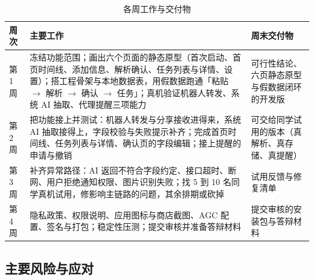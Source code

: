 \documentclass[12pt,a4paper,fontset=windows]{ctexart}
\begin{document}
\begin{table}[tbp]
\centering
\footnotesize
\begin{tabularx}{\textwidth}{@{}p{1.5cm}>{\raggedright\arraybackslash}X>{\raggedright\arraybackslash}p{4.2cm}@{}}
\toprule
周次 & 主要工作 & 周末交付物 \\
\midrule
第 1 周 & 冻结功能范围；画出六个页面的静态原型（首次启动、首页时间线、添加信息、解析确认、任务列表与详情、设置）；搭工程骨架与本地数据表，用假数据跑通「粘贴 $\rightarrow$ 解析 $\rightarrow$ 确认 $\rightarrow$ 任务」；真机验证机器人转发、系统 AI 抽取、代理提醒三项能力 & 可行性结论、六页静态原型与假数据闭环的开发版 \\
\midrule
第 2 周 & 把功能接上并测试：机器人转发与分享接收进得来，系统 AI 抽取接得上，字段校验与失败提示补齐；完成首页时间线、任务列表与详情、确认页的字段编辑；接上提醒的申请与撤销 & 可交给同学试用的版本（真解析、真存储、真提醒） \\
\midrule
第 3 周 & 补齐异常路径：AI 返回不符合字段约定、接口超时、断网、用户拒绝通知权限、图片识别失败；找 5 到 10 名同学真机试用，修影响主链路的问题，其余排期或砍掉 & 试用反馈与修复清单 \\
\midrule
第 4 周 & 隐私政策、权限说明、应用图标与商店截图、AGC 配置、签名与打包；稳定性压测；提交审核并准备答辩材料 & 提交审核的安装包与答辩材料 \\
\bottomrule
\end{tabularx}
\caption{各周工作与交付物}
\label{tab:weeks}
\end{table}

\subsection{主要风险与应对}
\end{document}
